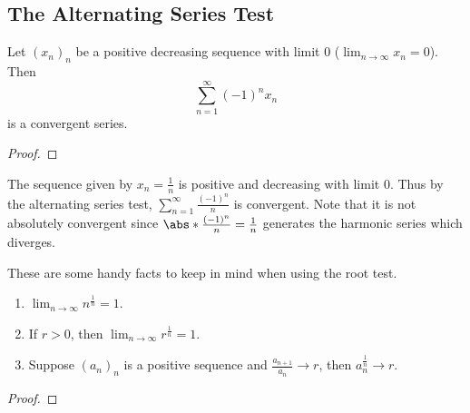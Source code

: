 \documentclass[../real_analysis.tex]{subfiles}
\begin{document}
        \subsection{The Alternating Series Test}\label{subsec:alternating-series-test}
            \begin{theorem}
                Let $(x_n)_n$ be a positive decreasing sequence with limit 0 ($\lim_{n\to\infty}x_n=0$). Then
                \begin{equation}
                    \sum_{n=1}^\infty (-1)^nx_n
                \end{equation}
                is a convergent series.
            \end{theorem}
            \begin{proof}
            \end{proof}
            \begin{example}
                The sequence given by $x_n=\frac{1}{n}$ is positive and decreasing with limit 0. Thus by the alternating series test, $\sum_{n=1}^\infty\frac{(-1)^n}{n}$ is convergent. Note that it is not absolutely convergent since $\abs*{\frac{(-1)^n}{n}}=\frac{1}{n}$ generates the harmonic series which diverges.
            \end{example}
            \begin{theorem}\label{thm:root-test-tools}
                These are some handy facts to keep in mind when using the root test.
                \begin{enumerate}[label={\upshape(\roman*)}]
                    \item $\lim_{n\to\infty}n^\frac{1}{n}=1$.
                    \item If $r>0$, then $\lim_{n\to\infty}r^\frac{1}{n}=1$.
                    \item Suppose $(a_n)_n$ is a positive sequence and $\frac{a_{n+1}}{a_n}\to r$, then $a_n^\frac{1}{n}\to r$.
                \end{enumerate}
            \end{theorem}
            \begin{proof}
            \end{proof}
\end{document}
